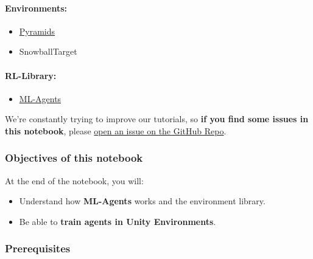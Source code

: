 \documentclass[11pt,a4paper]{article}
\begin{document}

\paragraph{Environments:}\label{environments}

\begin{itemize}
\tightlist
\item
  \href{https://github.com/Unity-Technologies/ml-agents/blob/main/docs/Learning-Environment-Examples.md\#pyramids}{Pyramids}
\item
  SnowballTarget
\end{itemize}

\paragraph{RL-Library:}\label{rl-library}

\begin{itemize}
\tightlist
\item
  \href{https://github.com/Unity-Technologies/ml-agents}{ML-Agents}
\end{itemize}

We're constantly trying to improve our tutorials, so \textbf{if you find some issues in this notebook}, please \href{https://github.com/huggingface/deep-rl-class/issues}{open an issue on the GitHub Repo}.

\subsubsection{Objectives of this notebook}\label{objectives-of-this-notebook}

At the end of the notebook, you will:

\begin{itemize}
\tightlist
\item
  Understand how \textbf{ML-Agents} works and the environment library.
\item
  Be able to \textbf{train agents in Unity Environments}.
\end{itemize}

\subsubsection{Prerequisites}\label{prerequisites}
\end{document}
